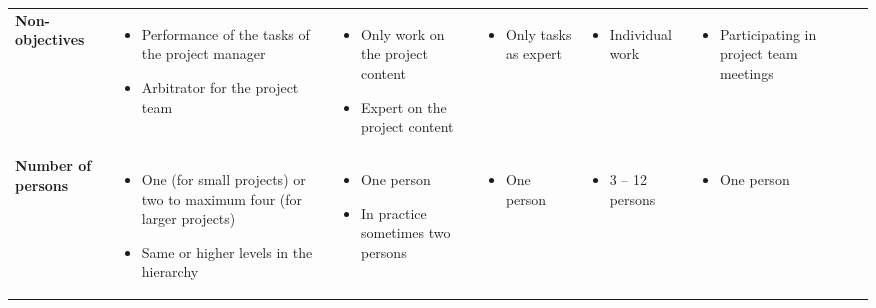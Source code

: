 \begin{table}
\begin{tabularx}{22cm}{X X X X X X r}
        \textbf{Non-objectives} & 
        \begin{itemize} [noitemsep,topsep=0pt, leftmargin=0pt]
            \item Performance of the tasks of the project manager
            \item Arbitrator for the project team 
        \end{itemize} & 
        \begin{itemize} [noitemsep,topsep=0pt, leftmargin=0pt]
            \item Only work on the project content
            \item Expert on the project content 
        \end{itemize} & 
        \begin{itemize} [noitemsep,topsep=0pt, leftmargin=0pt]
            \item Only tasks as expert 
        \end{itemize} & 
        \begin{itemize} [noitemsep,topsep=0pt, leftmargin=0pt]
            \item Individual work 
        \end{itemize} & 
        \begin{itemize} [noitemsep,topsep=0pt, leftmargin=0pt]
            \item Participating in project team meetings  
        \end{itemize} & 
         \\
        
        \textbf{Number of persons} & 
        \begin{itemize} [noitemsep,topsep=0pt, leftmargin=0pt]
            \item One (for small projects) or two to maximum four (for larger projects)
            \item Same or higher levels in the hierarchy 
        \end{itemize} & 
        \begin{itemize} [noitemsep,topsep=0pt, leftmargin=0pt]
            \item One person
            \item In practice sometimes two persons 
        \end{itemize} & 
        \begin{itemize} [noitemsep,topsep=0pt, leftmargin=0pt]
            \item One person 
        \end{itemize} & 
        \begin{itemize} [noitemsep,topsep=0pt, leftmargin=0pt]
            \item 3 – 12 persons 
        \end{itemize} & 
        \begin{itemize} [noitemsep,topsep=0pt, leftmargin=0pt]
            \item One person 
        \end{itemize} & 
         \\
        

\end{tabularx}
\end{table}
